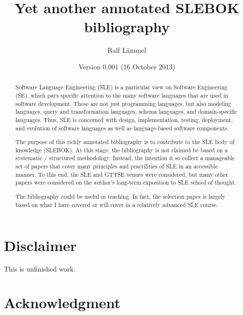 \documentclass[12pt]{article}
\title{Yet another annotated SLEBOK bibliography}
\author{Ralf L\"ammel}
\date{Version 0.001 (16 October 2013)}
\begin{document}
\maketitle


\begin{abstract}

  Software Language Engineering (SLE) is a particular view on Software
  Engineering (SE), which pays specific attention to the many software
  languages that are used in software development.  These are not just
  programming languages, but also modeling languages, query and
  transformation languages, schema languages, and domain-specific
  languages. Thus, SLE is concerned with design, implementation,
  testing, deployment, and evolution of software languages as well as
  language-based software components.

  \medskip

  The purpose of this richly annotated bibliography is to contribute
  to the SLE body of knowledge (SLEBOK). At this stage, the
  bibliography is not claimed be based on a systematic / structured
  methodology. Instead, the intention it so collect a manageable set
  of papers that cover many principles and practilities of SLE in an
  accessible manner. To this end, the SLE and GTTSE venues were
  considered, but many other papers were considered on the author's
  long-term exposition to SLE school of thought. 

  \medskip 
  The bibliography could be useful in teaching. In fact, the selection
  papes is largely based on what I have covered or will cover in a
  relatively advanced SLE course.

\end{abstract}


\newpage

\tableofcontents


\newpage

\section{Disclaimer}

This is unfinished work.

\section{Acknowledgment}
\end{document}
